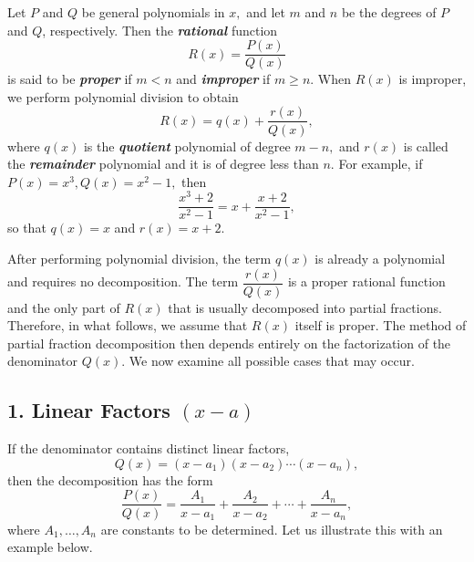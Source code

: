 %
%
%
%

Let $P$ and $Q$ be general polynomials in $x,$  and let $m$ and $n$ be  the degrees of $P$ and $Q$, respectively. Then the \textbf{\textit{rational}} function
\[
R(x)=\frac{P(x)}{Q(x)}
\]
is said to be \textbf{\textit{proper }} if \(m<n\) and \textbf{\textit{improper}} if  \(m\ge n.\)
When  $R(x)$ is improper, we   perform polynomial division to obtain
\[
R(x)=q(x)+\frac{r(x)}{Q(x)},
\]
where $q(x)$ is the \textbf{\textit{quotient}} polynomial of degree  $m-n,$ and $r(x)$ is called the \textbf{\textit{remainder}} polynomial and it is of degree less than $n.$ For example, if $P(x) = x^3, Q(x) = x^2-1,$ then 
\[\frac{x^3+2}{x^2-1} = x+ \frac{x+2}{x^2-1},\] so that \(q(x) = x\) and $r(x) = x+2.$

After performing polynomial division, the term \(q(x)\) is already a polynomial and requires no  decomposition. The  term \(\dfrac{r(x)}{Q(x)}\) is a proper rational function and the only part of $R(x)$ that is usually decomposed into partial fractions. Therefore, in what follows, we assume that \(R(x)\) itself is  proper. The  method of partial fraction decomposition  then depends entirely  on the factorization of the
denominator $Q(x)$.  We now examine  all possible cases that may occur.

\bigskip

\subsection*{1. Linear Factors \texorpdfstring{$(x-a)$}{(x-a)}}

If the denominator contains distinct linear factors,
\[
Q(x)=(x-a_1)(x-a_2)\cdots(x-a_n),
\]
then the decomposition has the form
\[
\frac{P(x)}{Q(x)}
= \frac{A_1}{x-a_1}+\frac{A_2}{x-a_2}+\cdots+\frac{A_n}{x-a_n},
\]
where  $A_1, \dots, A_n$ are constants to be determined. Let us illustrate this with an example below.

